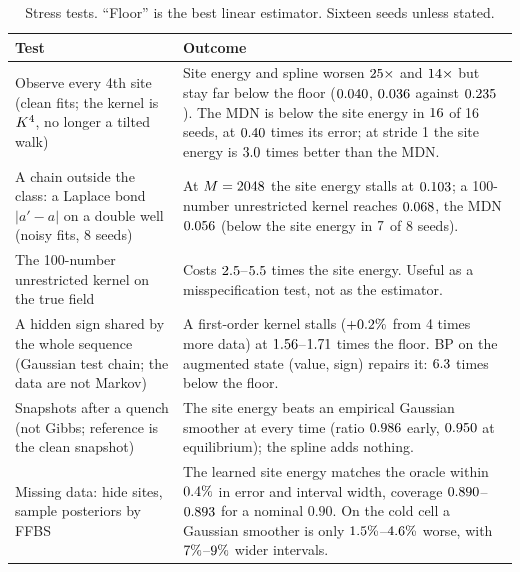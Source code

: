 \documentclass[11pt,a4paper]{article}
\begin{document}
\begin{table}[h]
\centering\small
\caption{Stress tests. ``Floor'' is the best linear estimator. Sixteen seeds unless stated.}
\label{tab:limits}
\begin{tabularx}{\textwidth}{@{}>{\raggedright\arraybackslash}p{}L@{}}
\toprule
Test & Outcome \\
\midrule
Observe every 4th site (clean fits; the kernel is $K^4$, no longer a tilted walk) & Site energy and spline worsen
$25\times$ and $14\times$ but stay far below the floor ($0.040$, $0.036$
against $0.235$). The MDN is below the site energy in $16$ of 16 seeds, at $0.40$ times its
error; at stride 1 the site energy is $3.0$ times better than the MDN. \\
A chain outside the class: a Laplace bond $|a'-a|$ on a double well (noisy fits, 8 seeds) & At $M=2048$ the site energy
stalls at $0.103$; a 100-number unrestricted kernel reaches $0.068$, the MDN $0.056$ (below the site
energy in $7$ of 8 seeds). \\
The 100-number unrestricted kernel on the true field & Costs $2.5$--$5.5$ times the site
energy.  Useful as a misspecification test, not as the
estimator. \\
A hidden sign shared by the whole sequence (Gaussian test chain; the data are not Markov) & A first-order kernel stalls
($+0.2\%$ from 4 times more data) at $1.56$--$1.71$ times the floor. BP on the augmented state
(value, sign) repairs it: $6.3$ times below the floor. \\
Snapshots after a quench (not Gibbs; reference is the clean snapshot) & The site energy beats an empirical Gaussian smoother at
every time (ratio $0.986$ early, $0.950$ at equilibrium); the spline adds nothing. \\
Missing data: hide sites, sample posteriors by FFBS & The learned site energy matches the oracle within $0.4\%$ in
error and interval width, coverage $0.890$--$0.893$ for a nominal $0.90$. On the cold cell a Gaussian
smoother is only $1.5\%$--$4.6\%$ worse, with $7\%$--$9\%$
wider intervals. \\
\bottomrule
\end{tabularx}
\end{table}
\end{document}
